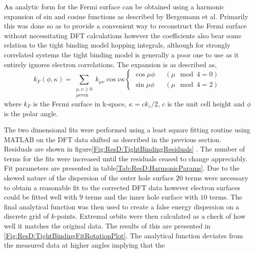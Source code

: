 An analytic form for the Fermi surface can be obtained using a harmonic expansion of sin and cosine functions as described by Bergemann et al\cite{Bergemann2000}. Primarily this was done so as to provide a convenient way to reconstruct the Fermi surface without necessitating DFT calculations however the coefficients also bear some relation to the tight binding model hopping integrals, although for strongly correlated systems the tight binding model is generally a poor one to use as it entirely ignores electron correlations. The expansion is as described as,
\begin{equation}
\label{Eqn:ResD:HarmonicExpansion}
k_F(\phi, \kappa) = \sum_{\substack{\mu,\nu \geq 0 \\ \mu \textrm{even}}}
    k_{\mu\nu}\cos\nu\kappa 
    \begin{cases}
        \cos{\mu\phi} \hspace{8pt} &(\mu\mod4 = 0) \\
        \sin{\mu\phi} \hspace{8pt} &(\mu\mod4 = 2)
    \end{cases}
\end{equation}
where $k_F$ is the Fermi surface in k-space, $\kappa = ck_z/2$, $c$ is the unit cell height and $\phi$ is the polar angle.

The two dimensional fits were performed using a least square fitting routine using MATLAB on the DFT data shifted as described in the previous section. Residuals are shown in figure\ref{Fig:ResD:TightBindingResiduals} . The number of terms for the fits were increased until the residuals ceased to change appreciably. Fit parameters are presented in table\ref{Tab:ResD:HarmonicParams}. Due to the skewed nature of the \kz dispersion of the outer hole surface $20$ terms were necessary to obtain a reasonable fit to the corrected DFT data however electron surfaces could be fitted well with $9$ terms and the inner hole surface with $10$ terms. The final analytical function was then used to create a false energy dispersion on a discrete grid of $k$-points. Extremal orbits were then calculated as a check of how well it matches the original data. The results of this are presented in \fig\ref{Fig:ResD:TightBindingFitRotationPlot}. The analytical function deviates from the measured data at higher angles implying that the 

